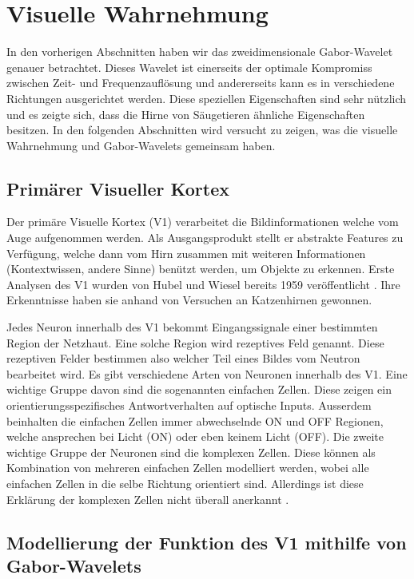 \section{Visuelle Wahrnehmung}

In den vorherigen Abschnitten haben wir das zweidimensionale Gabor-Wavelet genauer betrachtet.
Dieses Wavelet ist einerseits der optimale Kompromiss zwischen Zeit- und Frequenzauflösung und andererseits kann es in verschiedene Richtungen ausgerichtet werden.
Diese speziellen Eigenschaften sind sehr nützlich und es zeigte sich, dass die Hirne von Säugetieren ähnliche Eigenschaften besitzen.
In den folgenden Abschnitten wird versucht zu zeigen, was die visuelle Wahrnehmung und Gabor-Wavelets gemeinsam haben. 

\subsection{Primärer Visueller Kortex}\label{subsec:v1}

Der primäre Visuelle Kortex (V1) verarbeitet die Bildinformationen welche vom Auge aufgenommen werden.
Als Ausgangsprodukt stellt er abstrakte Features zu Verfügung, welche dann vom Hirn zusammen mit weiteren Informationen (Kontextwissen, andere Sinne)  benützt werden, um Objekte zu erkennen.
Erste Analysen des V1 wurden von Hubel und Wiesel bereits 1959 veröffentlicht \cite{paper:hubelwiesel}.
Ihre Erkenntnisse haben sie anhand von Versuchen an Katzenhirnen gewonnen.

Jedes Neuron innerhalb des V1 bekommt Eingangssignale einer bestimmten Region der Netzhaut.
Eine solche Region wird rezeptives Feld genannt.
Diese rezeptiven Felder bestimmen also welcher Teil eines Bildes vom Neutron bearbeitet wird.
Es gibt verschiedene Arten von Neuronen innerhalb des V1.
Eine wichtige Gruppe davon sind die sogenannten einfachen Zellen.
Diese zeigen ein orientierungsspezifisches Antwortverhalten auf optische Inputs.
Ausserdem beinhalten die einfachen Zellen immer abwechselnde ON und OFF Regionen, welche ansprechen bei Licht (ON) oder eben keinem Licht (OFF).
Die zweite wichtige Gruppe der Neuronen sind die komplexen Zellen.
Diese können als Kombination von mehreren einfachen Zellen modelliert werden, wobei alle einfachen Zellen in die selbe Richtung orientiert sind.
Allerdings ist diese Erklärung der komplexen Zellen nicht überall anerkannt \cite{book:neuroscience}.


\subsection{Modellierung der Funktion des V1 mithilfe von Gabor-Wavelets}

